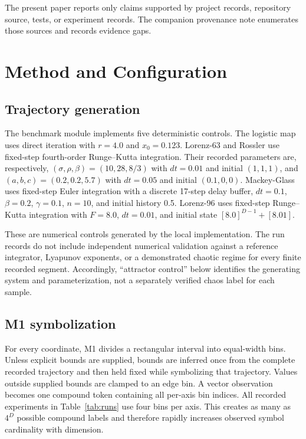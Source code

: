 \documentclass[11pt]{article}
\begin{document}
The present paper reports only claims supported by project records, repository
source, tests, or experiment records. The companion provenance note enumerates
those sources and records evidence gaps.

\section{Method and Configuration}

\subsection{Trajectory generation}

The benchmark module implements five deterministic controls. The logistic map
uses direct iteration with $r=4.0$ and $x_0=0.123$. Lorenz-63 and Rossler use
fixed-step fourth-order Runge--Kutta integration. Their recorded parameters are,
respectively, $(\sigma,\rho,\beta)=(10,28,8/3)$ with $dt=0.01$ and initial
$(1,1,1)$, and $(a,b,c)=(0.2,0.2,5.7)$ with $dt=0.05$ and initial
$(0.1,0,0)$. Mackey-Glass uses fixed-step Euler integration with a discrete
17-step delay buffer, $dt=0.1$, $\beta=0.2$, $\gamma=0.1$, $n=10$, and initial
history 0.5. Lorenz-96 uses fixed-step Runge--Kutta integration with $F=8.0$,
$dt=0.01$, and initial state
$[8.0]^{D-1}+[8.01]$.

These are numerical controls generated by the local implementation. The run
records do not include independent numerical validation against a reference
integrator, Lyapunov exponents, or a demonstrated chaotic regime for every
finite recorded segment. Accordingly, ``attractor control'' below identifies
the generating system and parameterization, not a separately verified chaos
label for each sample.

\subsection{M1 symbolization}

For every coordinate, M1 divides a rectangular interval into equal-width bins.
Unless explicit bounds are supplied, bounds are inferred once from the complete
recorded trajectory and then held fixed while symbolizing that trajectory.
Values outside supplied bounds are clamped to an edge bin. A vector observation
becomes one compound token containing all per-axis bin indices. All recorded
experiments in Table~\ref{tab:runs} use four bins per axis. This creates as many
as $4^D$ possible compound labels and therefore rapidly increases observed
symbol cardinality with dimension.
\end{document}
